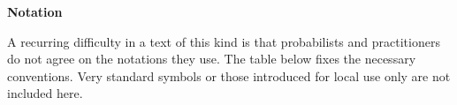 \thispagestyle{empty}


{\Huge \textbf{Notation}}

\vspace{0.6cm}

A recurring difficulty in a text of this kind is that probabilists and practitioners
do not agree on the notations they use.  The table below fixes the necessary conventions. Very standard symbols or those introduced for local use only  are not included here.


\vspace{0.3cm}

